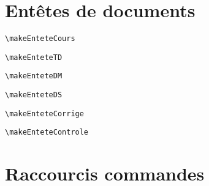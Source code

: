 \documentclass[a4paper,10pt]{article}
\begin{document}

\newpage
	\section{Entêtes de documents}
	
		\verb!\makeEnteteCours!
		
		\makeEnteteCours
		
		\verb!\makeEnteteTD!
		
		\makeEnteteTD
		
		\verb!\makeEnteteDM!
		
		\makeEnteteDM
		
		\verb!\makeEnteteDS!
		
		\makeEnteteDS
		
		\verb!\makeEnteteCorrige!
		
		\makeEnteteCorrige
		
		\verb!\makeEnteteControle!
		
		\makeEnteteControle
		
	\section{Raccourcis commandes}
	
\end{document}
